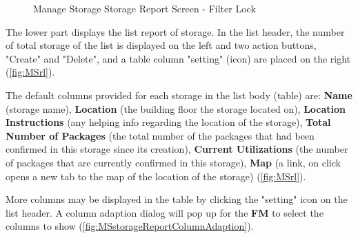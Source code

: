 \begin{figure}[!htb]
	\centering
    \vspace{5pt}
    
    \vspace{10pt}
    \caption{Manage Storage Storage Report Screen - Filter Lock}
	\label{fig:MSstorageReportFilterLock}
\end{figure}

\bigskip

The lower part displays the list report of storage. In the list header, the number of total storage of the list is displayed on the left and two action buttons, "Create" and "Delete", and a table column "setting" (icon) are placed on the right (\autoref{fig:MSrl}).

The default columns provided for each storage in the list body (table) are: \textbf{Name} (storage name), \textbf{Location} (the building floor the storage located on), \textbf{Location Instructions} (any helping info regarding the location of the storage), \textbf{Total Number of Packages} (the total number of the packages that had been confirmed in this storage since its creation), \textbf{Current Utilizations} (the number of packages that are currently confirmed in this storage), \textbf{Map} (a link, on click opens a new tab to the map of the location of the storage) (\autoref{fig:MSrl}). 


More columns may be displayed in the table by clicking the "setting" icon on the list header. A column adaption dialog will pop up for the \textbf{FM} to select the columns to show (\autoref{fig:MSstorageReportColumnAdaption}).


